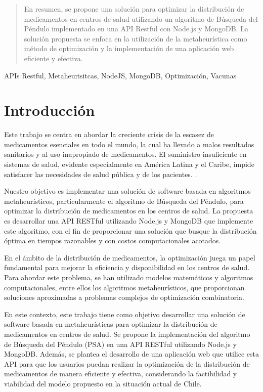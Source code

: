 \documentclass[conference]{IEEEtran}
\begin{document}
\begin{abstract}
    En resumen, se propone una solución para optimizar la distribución de
    medicamentos en centros de salud utilizando un algoritmo de Búsqueda del
    Péndulo implementado en una API Restful con Node.js y MongoDB. La solución
    propuesta se enfoca en la utilización de la metaheurística como método de
    optimización y la implementación de una aplicación web eficiente y
    efectiva.
\end{abstract}

\begin{IEEEkeywords}
    APIs Restful, Metaheurisitcas, NodeJS, MongoDB, Optimización, Vacunas
\end{IEEEkeywords}

\section{Introducción}

Este trabajo se centra en abordar la creciente crisis de la escasez de
medicamentos esenciales en todo el mundo, la cual ha llevado a malos resultados
sanitarios y al uso inapropiado de medicamentos. El suministro insuficiente en
sistemas de salud, evidente especialmente en América Latina y el Caribe, impide
satisfacer las necesidades de salud pública y de los pacientes. \cite{OMS2016}.

Nuestro objetivo es implementar una solución de software basada en algoritmos
metaheurísticos, particularmente el algoritmo de Búsqueda del Péndulo, para
optimizar la distribución de medicamentos en los centros de salud. La propuesta
es desarrollar una API RESTful utilizando Node.js y MongoDB que implemente este
algoritmo, con el fin de proporcionar una solución que busque la distribución
óptima en tiempos razonables y con costos computacionales acotados.

En el ámbito de la distribución de medicamentos, la optimización juega un papel
fundamental para mejorar la eficiencia y disponibilidad en los centros de
salud. Para abordar este problema, se han utilizado modelos matemáticos y
algoritmos computacionales, entre ellos los algoritmos metaheurísticos, que
proporcionan soluciones aproximadas a problemas complejos de optimización
combinatoria.

En este contexto, este trabajo tiene como objetivo desarrollar una solución de
software basada en metaheurísticas para optimizar la distribución de
medicamentos en centros de salud. Se propone la implementación del algoritmo de
Búsqueda del Péndulo (PSA) en una API RESTful utilizando Node.js y MongoDB.
Además, se plantea el desarrollo de una aplicación web que utilice esta API
para que los usuarios puedan realizar la optimización de la distribución de
medicamentos de manera eficiente y efectiva, considerando la factibilidad y
viabilidad del modelo propuesto en la situación actual de Chile.
\end{document}
